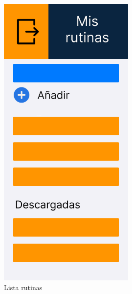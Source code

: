 \begin{figure}[H]
   \centering
    \includegraphics[width=0.6\textwidth]{fotos/Frame 46.png}
    \caption{Lista rutinas}
    \label{fig:Lista rutinas}
\end{figure}
